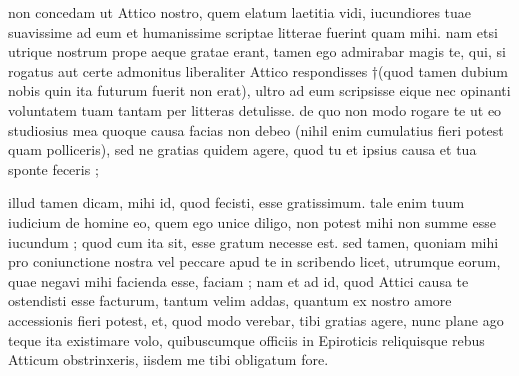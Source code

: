 


 non concedam ut Attico nostro, quem elatum laetitia vidi, iucundiores tuae suavissime ad eum et humanissime scriptae litterae fuerint quam mihi. nam etsi utrique nostrum prope aeque gratae erant, tamen ego admirabar magis te, qui, si rogatus aut certe admonitus liberaliter Attico respondisses †(quod tamen dubium nobis quin ita futurum fuerit non erat), ultro ad eum scripsisse eique nec opinanti voluntatem tuam tantam per litteras detulisse. de quo non modo rogare te ut eo studiosius mea quoque causa facias non debeo (nihil enim cumulatius fieri potest quam polliceris), sed ne gratias quidem agere, quod tu et ipsius causa et tua sponte feceris ;

 illud tamen dicam, mihi id, quod fecisti, esse gratissimum. tale enim tuum iudicium de homine eo, quem ego unice diligo, non potest mihi non summe esse iucundum ; quod cum ita sit, esse gratum necesse est. sed tamen, quoniam mihi pro coniunctione nostra vel peccare apud te in scribendo licet, utrumque eorum, quae negavi mihi facienda esse, faciam ; nam et ad id, quod Attici causa te ostendisti esse facturum, tantum velim addas, quantum ex nostro amore accessionis fieri potest, et, quod modo verebar, tibi gratias agere, nunc plane ago teque ita existimare volo, quibuscumque officiis in Epiroticis reliquisque rebus Atticum obstrinxeris, iisdem me tibi obligatum fore.
